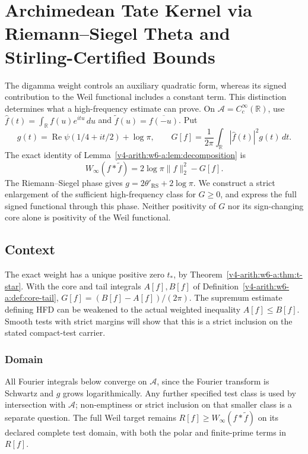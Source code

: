 \chapter{Archimedean Tate Kernel via Riemann--Siegel Theta and Stirling-Certified Bounds}
\label{v4-arith:w7-a:chapter}

The digamma weight controls an auxiliary quadratic form, whereas
its signed contribution to the Weil functional includes a constant
term. This distinction determines what a high-frequency estimate
can prove. On \(\mathscr A=C_c^\infty(\mathbb R)\), use
\(\widehat f(t)=\int_{\mathbb R}f(u)e^{itu}\,du\) and
\(\widetilde f(u)=\overline{f(-u)}\). Put
\[
 g(t)=\operatorname{Re}\psi(1/4+it/2)+\log\pi,\qquad
 G[f]=\frac1{2\pi}\int_{\mathbb R}|\widehat f(t)|^2g(t)\,dt.
\]
The exact identity of
Lemma~\ref{v4-arith:w6-a:lem:decomposition} is
\[
 W_\infty(f*\widetilde f)=2\log\pi\|f\|_2^2-G[f].
\]
The Riemann--Siegel phase gives
\(g=2\theta'_{\mathrm{RS}}+2\log\pi\). We construct a strict
enlargement of the sufficient high-frequency class for \(G\ge0\),
and express the full signed functional through this phase.
Neither positivity of \(G\) nor its sign-changing core alone is
positivity of the Weil functional.

\section{Context}
\label{v4-arith:w7-a:context}
The exact weight has a unique positive zero \(t_*\), by
Theorem~\ref{v4-arith:w6-a:thm:t-star}. With the core and tail
integrals \(A[f],B[f]\) of
Definition~\ref{v4-arith:w6-a:def:core-tail},
\(G[f]=(B[f]-A[f])/(2\pi)\). The supremum estimate defining HFD
can be weakened to the actual weighted inequality \(A[f]\le B[f]\).
Smooth tests with strict margins will show that this is a strict
inclusion on the stated compact-test carrier.

\subsection{Domain}
\label{v4-arith:w7-a:domain}
All Fourier integrals below converge on \(\mathscr A\), since the
Fourier transform is Schwartz and \(g\) grows logarithmically.
Any further specified test class is used by intersection with
\(\mathscr A\); non-emptiness or strict inclusion on that smaller
class is a separate question. The full Weil target remains
\(R[f]\ge W_\infty(f*\widetilde f)\) on its declared complete test
domain, with both the polar and finite-prime terms in \(R[f]\).

